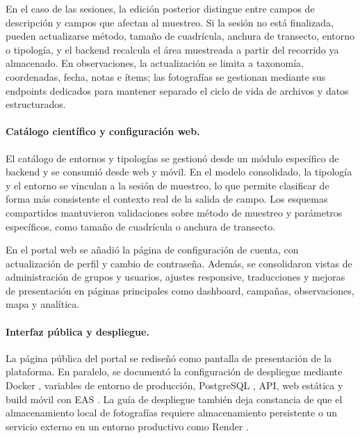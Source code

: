 En el caso de las sesiones, la edición posterior distingue entre campos de
descripción y campos que afectan al muestreo. Si la sesión no está finalizada,
pueden actualizarse método, tamaño de cuadrícula, anchura de transecto, entorno
o tipología, y el backend recalcula el área muestreada a partir del recorrido ya
almacenado. En observaciones, la actualización se limita a taxonomía,
coordenadas, fecha, notas e ítems; las fotografías se gestionan mediante sus
endpoints dedicados para mantener separado el ciclo de vida de archivos y datos
estructurados.

\paragraph{Catálogo científico y configuración web.}
El catálogo de entornos y tipologías se gestionó desde un módulo específico de
backend y se consumió desde web y móvil. En el modelo consolidado, la tipología
y el entorno se vinculan a la sesión de muestreo, lo que permite clasificar de
forma más consistente el contexto real de la salida de campo. Los esquemas
compartidos mantuvieron validaciones sobre método de muestreo y parámetros
específicos, como tamaño de cuadrícula o anchura de transecto.

En el portal web se añadió la página de configuración de cuenta, con actualización
de perfil y cambio de contraseña. Además, se consolidaron vistas de
administración de grupos y usuarios, ajustes responsive, traducciones y mejoras
de presentación en páginas principales como dashboard, campañas, observaciones,
mapa y analítica.

\paragraph{Interfaz pública y despliegue.}
La página pública del portal se rediseñó como pantalla de presentación de la
plataforma. En paralelo, se documentó la configuración de despliegue mediante
Docker \cite{docker}, variables de entorno de producción, PostgreSQL \cite{postgresql},
API, web estática y build móvil con EAS \cite{expo-eas}. La guía de despliegue también deja constancia de que el
almacenamiento local de fotografías requiere almacenamiento persistente o un
servicio externo en un entorno productivo como Render \cite{render}.

